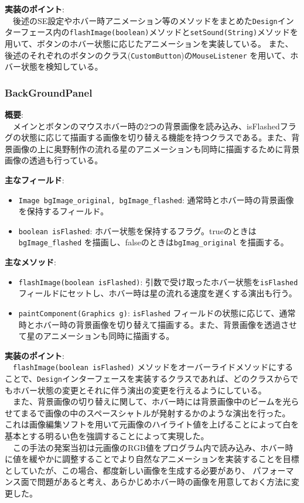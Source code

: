 \documentclass[11pt,a4j]{jarticle}
\begin{document}
\noindent\textbf{実装のポイント}: \\
　後述のSE設定やホバー時アニメーション等のメソッドをまとめた\texttt{Design}インターフェース内の\texttt{flashImage(boolean)}メソッドと\texttt{setSound(String)}メソッドを用いて、ボタンのホバー状態に応じたアニメーションを実装している。
また、後述のそれぞれのボタンのクラス(\texttt{CustomButton})の\texttt{MouseListener} を用いて、ホバー状態を検知している。

\subsubsection{BackGroundPanel}

\noindent\textbf{概要}: \\
　メインとボタンのマウスホバー時の2つの背景画像を読み込み、isFlashedフラグの状態に応じて描画する画像を切り替える機能を持つクラスである。また、背景画像の上に奥野制作の流れる星のアニメーションも同時に描画するために背景画像の透過も行っている。

\noindent\textbf{主なフィールド}:
\begin{itemize}
    \item \texttt{Image bgImage\_original, bgImage\_flashed}: 通常時とホバー時の背景画像を保持するフィールド。
    \item \texttt{boolean isFlashed}: ホバー状態を保持するフラグ。trueのときは\texttt{bgImage\_flashed} を描画し、falseのときは\texttt{bgImag\_original} を描画する。
\end{itemize}

\noindent\textbf{主なメソッド}:
\begin{itemize}
    \item \texttt{flashImage(boolean isFlashed)}: 引数で受け取ったホバー状態を\texttt{isFlashed} フィールドにセットし、ホバー時は星の流れる速度を遅くする演出も行う。
    \item \texttt{paintComponent(Graphics g)}: \texttt{isFlashed} フィールドの状態に応じて、通常時とホバー時の背景画像を切り替えて描画する。また、背景画像を透過させて星のアニメーションも同時に描画する。
\end{itemize}

\noindent\textbf{実装のポイント}: \\
　\texttt{flashImage(boolean isFlashed)} メソッドをオーバーライドメソッドにすることで、\texttt{Design}インターフェースを実装するクラスであれば、どのクラスからでもホバー状態の変更とそれに伴う演出の変更を行えるようにしている。\\
　また、背景画像の切り替えに関して、ホバー時には背景画像中のビームを光らせてまるで画像の中のスペースシャトルが発射するかのような演出を行った。
これは画像編集ソフトを用いて元画像のハイライト値を上げることによって白を基本とする明るい色を強調することによって実現した。\\
　この手法の発案当初は元画像のRGB値をプログラム内で読み込み、ホバー時に値を緩やかに調整することでより自然なアニメーションを実装することを目標としていたが、この場合、都度新しい画像を生成する必要があり、
パフォーマンス面で問題があると考え、あらかじめホバー時の画像を用意しておく方法に変更した。
\end{document}
